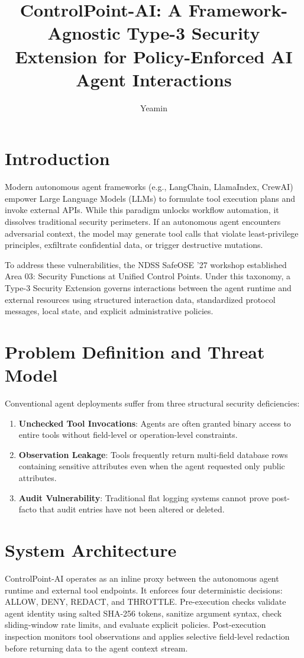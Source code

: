 \documentclass[sigconf]{acmart}
\title{ControlPoint-AI: A Framework-Agnostic Type-3 Security Extension for Policy-Enforced AI Agent Interactions}
\author{Yeamin}
\affiliation{%
  \institution{IndustrySphere AI}
  \city{Dhaka}
  \country{Bangladesh}
}
\begin{document}
\maketitle

\section{Introduction}
Modern autonomous agent frameworks (e.g., LangChain, LlamaIndex, CrewAI) empower Large Language Models (LLMs) to formulate tool execution plans and invoke external APIs. While this paradigm unlocks workflow automation, it dissolves traditional security perimeters. If an autonomous agent encounters adversarial context, the model may generate tool calls that violate least-privilege principles, exfiltrate confidential data, or trigger destructive mutations.

To address these vulnerabilities, the NDSS SafeOSE '27 workshop established Area 03: Security Functions at Unified Control Points. Under this taxonomy, a Type-3 Security Extension governs interactions between the agent runtime and external resources using structured interaction data, standardized protocol messages, local state, and explicit administrative policies.

\section{Problem Definition and Threat Model}
Conventional agent deployments suffer from three structural security deficiencies:
\begin{enumerate}
    \item \textbf{Unchecked Tool Invocations}: Agents are often granted binary access to entire tools without field-level or operation-level constraints.
    \item \textbf{Observation Leakage}: Tools frequently return multi-field database rows containing sensitive attributes even when the agent requested only public attributes.
    \item \textbf{Audit Vulnerability}: Traditional flat logging systems cannot prove post-facto that audit entries have not been altered or deleted.
\end{enumerate}

\section{System Architecture}
ControlPoint-AI operates as an inline proxy between the autonomous agent runtime and external tool endpoints. It enforces four deterministic decisions: ALLOW, DENY, REDACT, and THROTTLE.
Pre-execution checks validate agent identity using salted SHA-256 tokens, sanitize argument syntax, check sliding-window rate limits, and evaluate explicit policies.
Post-execution inspection monitors tool observations and applies selective field-level redaction before returning data to the agent context stream.
\end{document}

